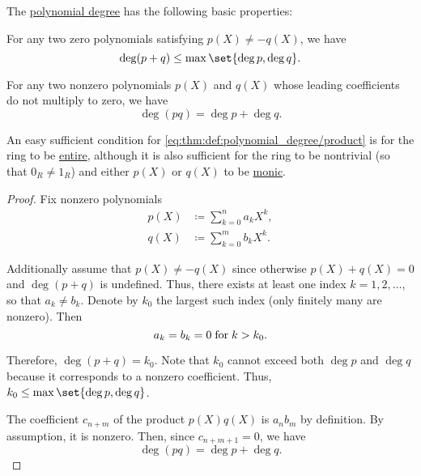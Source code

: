 \begin{proposition}\label{thm:def:polynomial_degree}
  The \hyperref[def:polynomial_degree]{polynomial degree} has the following basic properties:
  \begin{thmenum}
     For any two zero polynomials satisfying \( p(X) \neq -q(X) \), we have
    \begin{equation}\label{eq:thm:def:polynomial_degree/sum}
      \deg (p + q) \leq \max \set{ \deg p, \deg q }.
    \end{equation}

     For any two nonzero polynomials \( p(X) \) and \( q(X) \) whose leading coefficients do not multiply to zero, we have
    \begin{equation}\label{eq:thm:def:polynomial_degree/product}
      \deg (pq) = \deg p + \deg q.
    \end{equation}

    An easy sufficient condition for \eqref{eq:thm:def:polynomial_degree/product} is for the ring to be \hyperref[def:entire_semiring]{entire}, although it is also sufficient for the ring to be nontrivial (so that \( 0_R \neq 1_R \)) and either \( p(X) \) or \( q(X) \) to be \hyperref[def:monic_polynomial]{monic}.
  \end{thmenum}
\end{proposition}
\begin{proof}
  Fix nonzero polynomials
  \begin{align*}
    p(X) &\coloneqq \sum_{k=0}^n a_k X^k, \\
    q(X) &\coloneqq \sum_{k=0}^m b_k X^k.
  \end{align*}

   Additionally assume that \( p(X) \neq -q(X) \) since otherwise \( p(X) + q(X) = 0 \) and \( \deg(p + q) \) is undefined. Thus, there exists at least one index \( k = 1, 2, \ldots \), so that \( a_k \neq b_k \). Denote by \( k_0 \) the largest such index (only finitely many are nonzero). Then
  \begin{equation*}
    a_k = b_k = 0 \T{for} k > k_0.
  \end{equation*}

  Therefore, \( \deg(p + q) = k_0 \). Note that \( k_0 \) cannot exceed both \( \deg p \) and \( \deg q \) because it corresponds to a nonzero coefficient. Thus, \( k_0 \leq \max\set{ \deg p, \deg q } \).

   The coefficient \( c_{n + m} \) of the product \( p(X) q(X) \) is \( a_n b_m \) by definition. By assumption, it is nonzero. Then, since \( c_{n+m+1} = 0 \), we have
  \begin{equation*}
    \deg (pq) = \deg p + \deg q.
  \end{equation*}
\end{proof}

